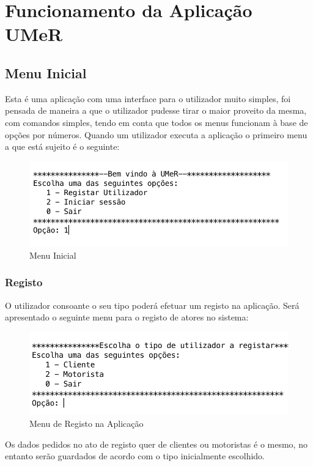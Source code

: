 \chapter{Funcionamento da Aplicação UMeR}
\section{Menu Inicial}
Esta é  uma aplicação com uma interface para o utilizador muito simples, foi pensada
de maneira a que o utilizador pudesse tirar o maior proveito da mesma, com comandos simples, tendo em conta que todos os menus funcionam à base de opções por números.
Quando um utilizador executa a aplicação o primeiro menu a que está sujeito é o
seguinte:

\begin{figure}[htpb]
\centering
\includegraphics[scale=0.6]{imagem/menuInicial}
\caption{Menu Inicial  }
\label{p3:fig:p2_paginicial}
\end{figure}

\subsection{Registo}

O utilizador consoante o seu tipo poderá efetuar um registo na aplicação. Será apresentado o seguinte menu para o registo de atores no sistema: 

\begin{figure}[htpb]
	\centering
	\includegraphics[scale=0.6]{imagem/escolhaTipoAtor}
	\caption{Menu de Registo na Aplicação }
	\label{p3:fig:p2_escolhaTipoAtor}
\end{figure}
Os dados pedidos no ato de registo quer de clientes ou motoristas é o mesmo, no entanto serão guardados de acordo com o tipo inicialmente escolhido. 
\newline

